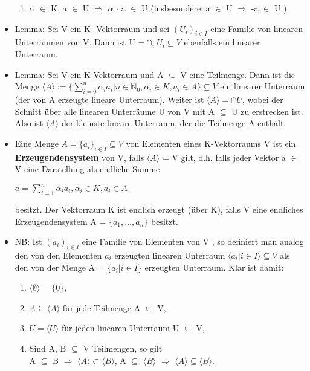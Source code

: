 \begin{itemize}
\begin{enumerate}
\item $\alpha$ $\in$ K, a $\in$ U $\Rightarrow$ $\alpha$ $\cdot$ a $\in$ U (insbesondere: a $\in$ U $\Rightarrow$ -a $\in$ U ).
\end{enumerate}
\item Lemma: Sei V ein K -Vektorraum und sei $(U_i )_{i \in I}$ eine Familie von linearen Unterräumen von V. Dann ist U =$\cap_i U_i \subseteq V$ ebenfalls ein linearer Unterraum.
\item Lemma: Sei V ein K-Vektorraum und A $\subseteq$ V eine Teilmenge. Dann ist die Menge $\langle A \rangle := \big\{ \sum\nolimits_{i=0}^{n} \alpha_i a_i | n \in \mathbb{N}_0, \alpha_i \in K, a_i \in A \big\} \subseteq V$ ein linearer Unterraum (der von A erzeugte lineare Unterraum). Weiter ist $\langle A \rangle = \cap U$, wobei der Schnitt über alle linearen Unterräume U von V mit A $\subseteq$ U zu erstrecken ist. Also ist $\langle A \rangle$ der kleinste lineare Unterraum, der die Teilmenge A enthält.
\item Eine Menge $A = \{a_i\}_{i \in I} \subseteq V$ von Elementen eines K-Vektorraums V ist ein \textbf{Erzeugendensystem} von V, falls $\langle A \rangle$ = V gilt, d.h. falls jeder Vektor a $\in$ V eine Darstellung als endliche Summe
\begin{center}
$a = \sum\nolimits_{i=1}^{n}\alpha_i a_i, \alpha_i \in K, a_i \in A$
\end{center}
besitzt. Der Vektorraum K ist endlich erzeugt (über K), falls V eine endliches Erzeugendensystem A = $\{a_1, …, a_n\}$ besitzt.
\item NB: Ist $(a_i)_{i \in I}$ eine Familie von Elementen von V , so definiert man analog den von den Elementen $a_i$ erzeugten linearen Unterraum $\langle a_i | i \in I \rangle \subseteq V$ als den von der Menge A = $\{a_i | i \in I\}$ erzeugten Unterraum. Klar ist 
damit:
\begin{enumerate}
\item $\langle \emptyset \rangle = \{0\}$,
\item $A \subseteq \langle A \rangle$ für jede Teilmenge A $\subseteq$ V, 
\item $U = \langle U \rangle$ für jeden linearen Unterraum U $\subseteq$ V, 
\item Sind A, B $\subseteq$ V Teilmengen, so gilt\\ 
A $\subseteq$ B $\Rightarrow$ $\langle A \rangle \subset \langle B \rangle$, \hspace*{3mm}
A $\subseteq$ $\langle B \rangle$ $\Rightarrow$ $\langle A \rangle \subseteq \langle B \rangle$.

\end{enumerate}
\end{itemize}
